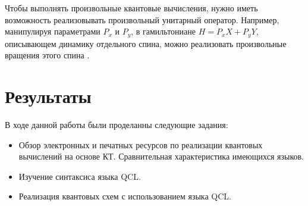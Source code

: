 \documentclass[14pt,a4paper]{PhDthesis}
\begin{document}
Чтобы выполнять произвольные квантовые вычисления, нужно иметь возможность реализовывать произвольный унитарный оператор. Например, манипулируя
параметрами $P_{x}$ и $P_{y}$, в гамильтониане $H = P_{x}X + P_{y}Y$, описывающем динамику отдельного спина, можно реализовать произвольные вращения этого спина \cite{Blum:1983ru}.

\newpage
\section*{Результаты}
В ходе данной работы были проделанны следующие задания:
\begin{itemize}
  \item Обзор электронных и печатных ресурсов по реализации квантовых вычислений на основе КТ. Сравнительная характеристика имеющихся языков.
  \item Изучение синтаксиса языка QCL.
  \item Реализация квантовых схем с использованием языка QCL.
\end{itemize}

\newpage


\end{document}
